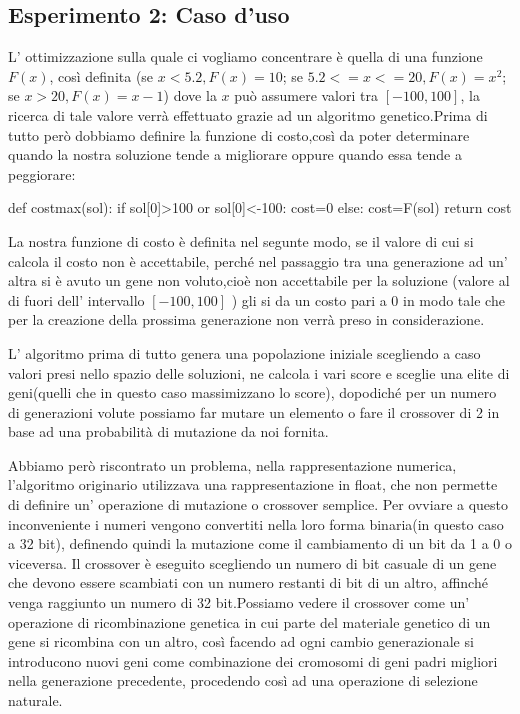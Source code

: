 		\subsection{Esperimento 2: Caso d'uso}
			L' ottimizzazione sulla quale ci vogliamo concentrare è quella di una funzione $F(x)$, così definita (se $x<5.2,F(x)=10$; se $5.2<=x<=20,F(x)=x^2$; se $x>20,F(x)=x-1$) dove la $x$ può assumere valori tra $[-100,100]$, la ricerca di tale valore verrà effettuato grazie ad un algoritmo genetico.Prima di tutto però dobbiamo definire la funzione di costo,così da poter determinare quando la nostra soluzione tende a migliorare oppure quando essa tende a peggiorare:
			\begin{python}
		def costmax(sol):
			if sol[0]>100 or sol[0]<-100:
				cost=0
			else:
				cost=F(sol)
		return cost  
			\end{python}
			La nostra funzione di costo è definita nel segunte modo, se il valore di cui si calcola il costo non è accettabile, perché nel passaggio tra una generazione ad un' altra si è avuto un gene non voluto,cioè non accettabile per la soluzione (valore al di fuori dell' intervallo $[-100,100]$ ) gli si da un costo pari a 0 in modo tale che per la creazione della prossima generazione non verrà preso in considerazione.\par
			L' algoritmo prima di tutto genera una popolazione iniziale scegliendo a caso valori presi nello spazio delle soluzioni, ne calcola i vari score e sceglie una elite di geni(quelli che in questo caso massimizzano lo score), dopodiché per un numero di generazioni volute possiamo far mutare un elemento o fare il crossover di 2 in base ad una probabilità di mutazione da noi fornita. \par 
			Abbiamo però riscontrato un problema, nella rappresentazione numerica, l'algoritmo originario utilizzava una rappresentazione in float, che non permette di definire un' operazione di mutazione o crossover semplice. Per ovviare a questo inconveniente i numeri vengono convertiti nella loro forma binaria(in questo caso a 32 bit), definendo quindi la mutazione come il cambiamento di un bit da 1 a 0 o viceversa. Il crossover è eseguito scegliendo un numero di bit casuale di un gene che devono essere scambiati con un numero restanti di bit di un altro, affinché venga raggiunto un numero di 32 bit.Possiamo vedere il crossover come un' operazione di ricombinazione genetica in cui parte del materiale genetico di un gene si ricombina con un altro, così facendo ad ogni cambio generazionale si introducono nuovi geni come combinazione dei cromosomi di geni padri migliori nella generazione precedente, procedendo così ad una operazione di selezione naturale.
